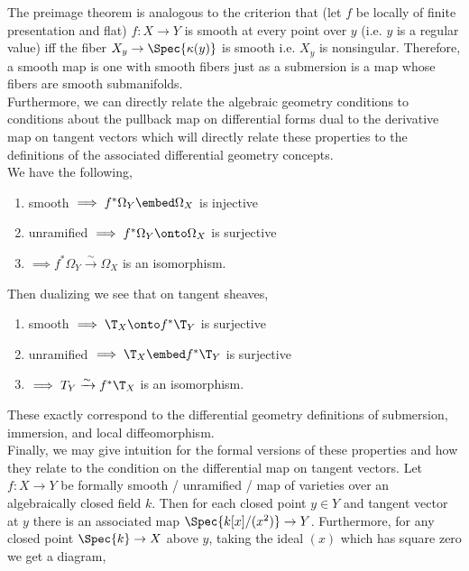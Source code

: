 \documentclass[12pt]{article}
\begin{document}
\noindent
The preimage theorem is analogous to the criterion that (let $f$ be locally of finite presentation and flat) $f : X \to Y$ is smooth at every point over $y$ (i.e. $y$ is a regular value) iff the fiber $X_y \to \Spec{\kappa(y)}$ is smooth i.e. $X_y$ is nonsingular. Therefore, a smooth map is one with smooth fibers just as a submersion is a map whose fibers are smooth submanifolds.
\bigskip\\
Furthermore, we can directly relate the algebraic geometry conditions to conditions about the pullback map on differential forms dual to the derivative map on tangent vectors which will directly relate these properties to the definitions of the associated differential geometry concepts.
\bigskip\\
We have the following,
\begin{enumerate}
\item smooth $\implies f^* \Omega_Y \embed \Omega_X$ is injective 
\item unramified $\implies f^* \Omega_Y \onto \Omega_X$ is surjective
\item \etale $\implies f^* \Omega_Y \xrightarrow{\sim} \Omega_X$ is an isomorphism.
\end{enumerate}
Then dualizing we see that on tangent sheaves,
\begin{enumerate}
\item smooth $\implies \T_X \onto f^* \T_Y$ is surjective 
\item unramified $\implies \T_X \embed f^* \T_Y$ is surjective
\item \etale $\implies T_Y \xrightarrow{\sim} f^* \T_X$ is an isomorphism.
\end{enumerate}
These exactly correspond to the differential geometry definitions of submersion, immersion, and local diffeomorphism. 
\bigskip\\
Finally, we may give intuition for the formal versions of these properties and how they relate to the condition on the differential map on tangent vectors. Let $f : X \to Y$ be formally smooth / unramified / \etale map of varieties over an algebraically closed field $k$. Then for each closed point $y \in Y$ and tangent vector at $y$ there is an associated map $\Spec{k[x]/(x^2)} \to Y$. Furthermore, for any closed point $\Spec{k} \to X$ above $y$, taking the ideal $(x)$ which has square zero we get a diagram,
\begin{center}
\end{center}
\end{document}
